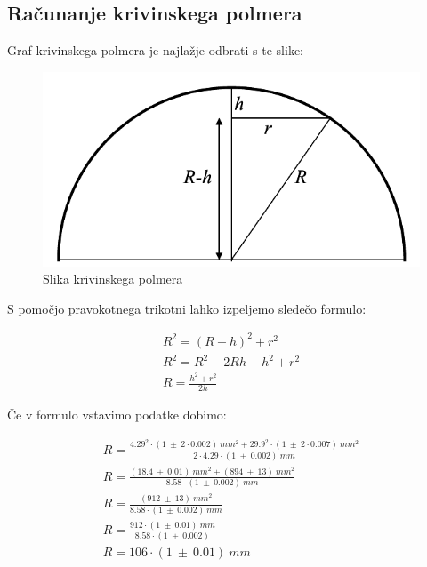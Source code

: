 \documentclass{report}
\begin{document}
\pagebreak
\subsection{Računanje krivinskega polmera}

Graf krivinskega polmera je najlažje odbrati s te slike:

\begin{figure}[H]
  \caption{Slika krivinskega polmera}
  \label{fig:graf}
  \includegraphics[width=\textwidth]{Krivinski_polmer}
\end{figure}
S pomočjo pravokotnega trikotni lahko izpeljemo sledečo formulo:


\begin{equation}
  \begin{gathered}
    R^2 = (R - h)^2 + r^2 \\
    R^2 = R^2 - 2Rh + h^2 + r^2 \\
    R = \frac{h^2 + r^2}{2h}
  \end{gathered}
\end{equation}

Če v formulo vstavimo podatke dobimo:

\begin{equation}
  \begin{gathered}
    R = \frac{4.29^2 \cdot (1 \ \pm \ 2 \cdot 0.002) \ mm^2 + 29.9^2 \cdot (1 \ \pm \ 2 \cdot 0.007) \ mm^2}{2 \cdot 4.29 \cdot (1 \ \pm \ 0.002) \ mm}\\
    R = \frac{(18.4 \ \pm \ 0.01) \ mm^2 + (894 \ \pm \ 13) \ mm^2}{8.58 \cdot (1 \ \pm \ 0.002) \ mm}\\
    R = \frac{(912 \ \pm \ 13) \ mm^2}{8.58 \cdot (1 \ \pm \ 0.002) \ mm}\\
    R = \frac{912 \cdot (1 \ \pm \ 0.01) \ mm}{8.58 \cdot (1 \ \pm \ 0.002)}\\
    \boxed{R = 106 \cdot (1 \ \pm \ 0.01) \ mm}
  \end{gathered}
\end{equation}
\end{document}
